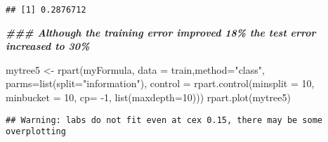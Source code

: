 \documentclass[
]{article}
\newenvironment{Shaded}{\begin{snugshade}}{\end{snugshade}}
\newcommand{\AttributeTok}[1]{\textcolor[rgb]{0.77,0.63,0.00}{#1}}
\newcommand{\DecValTok}[1]{\textcolor[rgb]{0.00,0.00,0.81}{#1}}
\newcommand{\DocumentationTok}[1]{\textcolor[rgb]{0.56,0.35,0.01}{\textbf{\textit{#1}}}}
\newcommand{\FunctionTok}[1]{\textcolor[rgb]{0.00,0.00,0.00}{#1}}
\newcommand{\NormalTok}[1]{#1}
\newcommand{\OtherTok}[1]{\textcolor[rgb]{0.56,0.35,0.01}{#1}}
\newcommand{\SpecialCharTok}[1]{\textcolor[rgb]{0.00,0.00,0.00}{#1}}
\newcommand{\StringTok}[1]{\textcolor[rgb]{0.31,0.60,0.02}{#1}}
\begin{document}
\begin{Shaded}
\end{Shaded}

\begin{verbatim}
## [1] 0.2876712
\end{verbatim}

\begin{Shaded}
\begin{Highlighting}[]
\DocumentationTok{\#\#\# Although the training error improved 18\% the test error increased to 30\%}
\end{Highlighting}
\end{Shaded}

\begin{Shaded}
\begin{Highlighting}[]
\NormalTok{mytree5 }\OtherTok{\textless{}{-}} \FunctionTok{rpart}\NormalTok{(myFormula, }
\AttributeTok{data =}\NormalTok{ train,}\AttributeTok{method=}\StringTok{"class"}\NormalTok{, }
\AttributeTok{parms=}\FunctionTok{list}\NormalTok{(}\AttributeTok{split=}\StringTok{"information"}\NormalTok{), }
\AttributeTok{control =} \FunctionTok{rpart.control}\NormalTok{(}\AttributeTok{minsplit =} \DecValTok{10}\NormalTok{, }\AttributeTok{minbucket =} \DecValTok{10}\NormalTok{, }\AttributeTok{cp=} \SpecialCharTok{{-}}\DecValTok{1}\NormalTok{, }
\FunctionTok{list}\NormalTok{(}\AttributeTok{maxdepth=}\DecValTok{10}\NormalTok{)))}
\FunctionTok{rpart.plot}\NormalTok{(mytree5)}
\end{Highlighting}
\end{Shaded}

\begin{verbatim}
## Warning: labs do not fit even at cex 0.15, there may be some overplotting
\end{verbatim}
\end{document}
